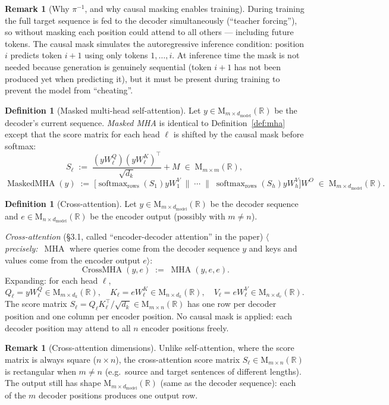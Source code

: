 \documentclass[11pt]{amsart}
\theoremstyle{plain}
\theoremstyle{definition}
\newtheorem{definition}[theorem]{Definition}
\newtheorem{remark}[theorem]{Remark}
\newcommand{\R}{\mathbb{R}}
\newcommand{\Mat}[2]{\mathrm{M}_{#1 \times #2}(\R)}
\newcommand{\softmax}{\operatorname{softmax}}
\newcommand{\MHA}{\operatorname{MHA}}
\newcommand{\MaskedMHA}{\operatorname{MaskedMHA}}
\newcommand{\CrossMHA}{\operatorname{CrossMHA}}
\newcommand{\precise}[1]{%
  $\langle$\textit{precisely:}~#1$\rangle$}
\begin{document}
\begin{remark}[Why $\pi^{-1}$, and why causal masking enables training]
During training the full target sequence is fed to the decoder simultaneously
(``teacher forcing''), so without masking each position could attend to all
others — including future tokens.  The causal mask simulates the
autoregressive inference condition: position $i$ predicts token $i+1$ using
only tokens $1,\ldots,i$.  At inference time the mask is not needed because
generation is genuinely sequential (token $i+1$ has not been produced yet
when predicting it), but it must be present during training to prevent
the model from ``cheating''.
\end{remark}

\begin{definition}[Masked multi-head self-attention]
\label{def:masked-mha}
Let $y \in \Mat{m}{d_{\mathrm{model}}}$ be the decoder's current sequence.
\emph{Masked MHA} is identical to Definition~\ref{def:mha} except that the
score matrix for each head $\ell$ is shifted by the causal mask before softmax:
\[
    S_\ell \;:=\; \frac{(yW^Q_\ell)(yW^K_\ell)^\top}{\sqrt{d_k}} + M
    \;\in\; \Mat{m}{m},
\]
\[
    \MaskedMHA(y) \;:=\;
    \bigl[\softmax_{\mathrm{rows}}(S_1)yW^V_1 \;\|\;
          \cdots \;\|\;
          \softmax_{\mathrm{rows}}(S_h)yW^V_h\bigr] W^O
    \;\in\; \Mat{m}{d_{\mathrm{model}}}.
\]
\end{definition}

\begin{definition}[Cross-attention]
\label{def:cross-attention}
Let $y \in \Mat{m}{d_{\mathrm{model}}}$ be the decoder sequence and
$e \in \Mat{n}{d_{\mathrm{model}}}$ be the encoder output (possibly with
$m \neq n$).

\emph{Cross-attention} (\S3.1, called ``encoder-decoder attention'' in the
paper) \precise{$\MHA$ where queries come from the decoder sequence $y$ and
keys and values come from the encoder output $e$}:
\[
    \CrossMHA(y, e) \;:=\; \MHA(y, e, e).
\]
Expanding: for each head $\ell$,
\[
    Q_\ell = yW^Q_\ell \in \Mat{m}{d_k}, \quad
    K_\ell = eW^K_\ell \in \Mat{n}{d_k}, \quad
    V_\ell = eW^V_\ell \in \Mat{n}{d_v}.
\]
The score matrix $S_\ell = Q_\ell K_\ell^\top/\sqrt{d_k} \in \Mat{m}{n}$
has one row per decoder position and one column per encoder position.  No
causal mask is applied: each decoder position may attend to all $n$ encoder
positions freely.
\end{definition}

\begin{remark}[Cross-attention dimensions]
Unlike self-attention, where the score matrix is always square ($n \times n$),
the cross-attention score matrix $S_\ell \in \Mat{m}{n}$ is rectangular when
$m \neq n$ (e.g.\ source and target sentences of different lengths).  The
output still has shape $\Mat{m}{d_{\mathrm{model}}}$ (same as the decoder
sequence): each of the $m$ decoder positions produces one output row.
\end{remark}
\end{document}
